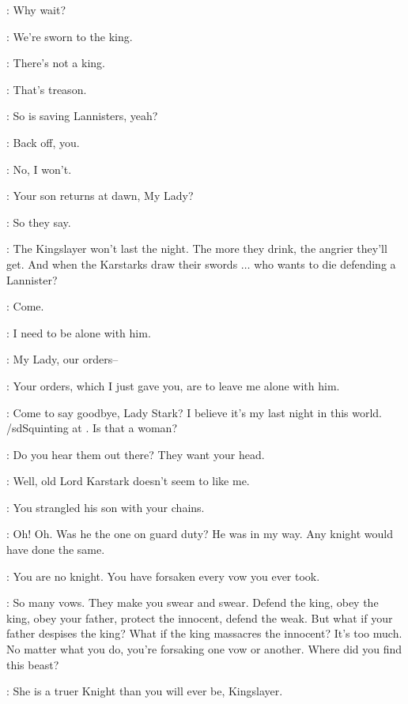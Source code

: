 \SOLDIERa: Why wait?

\SOLDIERb: We're sworn to the king.

\SOLDIERa: There's not a king.

\SOLDIERb: That's treason.

\SOLDIERa: So is saving Lannisters, yeah?

\SOLDIERb: Back off, you.

\SOLDIERa: No, I won't.


\BRIENNE: Your son returns at dawn, My Lady?

\CATELYN: So they say.

\BRIENNE: The Kingslayer won't last the night. The more they drink, the angrier they'll get. And when the Karstarks draw their swords $\ldots$ who wants to die defending a Lannister?

\CATELYN: Come.


\CATELYN: I need to be alone with him.

\GUARD: My Lady, our orders--

\CATELYN: Your orders, which I just gave you, are to leave me alone with him.


\JAIME: Come to say goodbye, Lady Stark? I believe it's my last night in this world. /sd{Squinting at \BRIENNE.} Is that a woman?

\CATELYN: Do you hear them out there? They want your head.

\JAIME: Well, old Lord Karstark doesn't seem to like me.

\CATELYN: You strangled his son with your chains.

\JAIME: Oh! Oh. Was he the one on guard duty? He was in my way. Any knight would have done the same.

\CATELYN: You are no knight. You have forsaken every vow you ever took.

\JAIME: So many vows. They make you swear and swear. Defend the king, obey the king, obey your father, protect the innocent, defend the weak. But what if your father despises the king? What if the king massacres the innocent? It's too much. No matter what you do, you're forsaking one vow or another.  Where did you find this beast?

\CATELYN: She is a truer Knight than you will ever be, Kingslayer.

